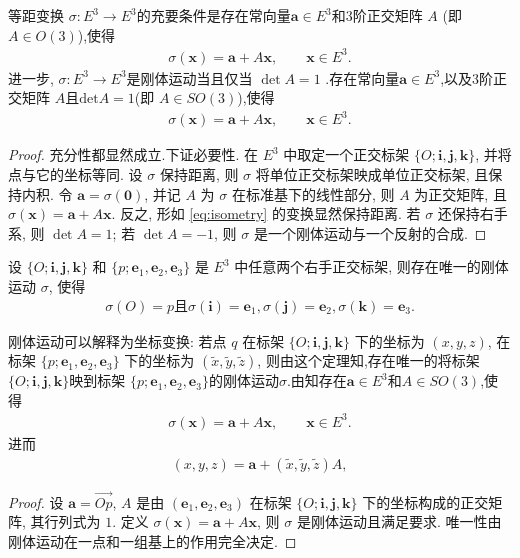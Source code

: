 \documentclass[../../main.tex]{subfiles}%
\begin{document}
\begin{theorem}\label{theorem:刚体运动等距变换的充要条件}
等距变换 $\sigma: E^3 \to E^3$的充要条件是存在常向量$\bm a\in E^3$和$3$阶正交矩阵 $A$ (即$A\in O(3)$),使得
\begin{align}
\sigma(\bm x) = \bm a + A\bm x, \qquad \bm x\in E^3. \label{eq:isometry}
\end{align}
进一步, $\sigma: E^3 \to E^3$是刚体运动当且仅当 $\det A = 1$ .存在常向量$\bm a\in E^3$,以及$3$阶正交矩阵 $A$且$\mathrm{det}A=1$(即 $A\in SO(3)$),使得
\begin{align*}
\sigma(\bm x) = \bm a + A\bm x, \qquad \bm x\in E^3.
\end{align*}
\end{theorem}
\begin{proof}

充分性都显然成立.下证必要性.
在 $E^3$ 中取定一个正交标架 $\{O;\bm i,\bm j,\bm k\}$, 并将点与它的坐标等同. 设 $\sigma$ 保持距离, 则 $\sigma$ 将单位正交标架映成单位正交标架, 且保持内积. 令 $\bm a = \sigma(\bm 0)$, 并记 $A$ 为 $\sigma$ 在标准基下的线性部分, 则 $A$ 为正交矩阵, 且 $\sigma(\bm x)=\bm a+A\bm x$. 反之, 形如 \eqref{eq:isometry} 的变换显然保持距离. 若 $\sigma$ 还保持右手系, 则 $\det A = 1$; 若 $\det A = -1$, 则 $\sigma$ 是一个刚体运动与一个反射的合成.
\end{proof}

\begin{theorem}
设 $\{O;\bm i,\bm j,\bm k\}$ 和 $\{p;\bm e_1,\bm e_2,\bm e_3\}$ 是 $E^3$ 中任意两个右手正交标架, 则存在唯一的刚体运动 $\sigma$, 使得
\begin{align*}
\sigma (O)=p\text{且}\sigma (\boldsymbol{i})=\boldsymbol{e}_1,\sigma (\boldsymbol{j})=\boldsymbol{e}_2,\sigma (\boldsymbol{k})=\boldsymbol{e}_3.
\end{align*}
\end{theorem}
\begin{remark}
刚体运动可以解释为坐标变换: 若点 $q$ 在标架 $\{O;\bm i,\bm j,\bm k\}$ 下的坐标为 $(x,y,z)$, 在标架 $\{p;\bm e_1,\bm e_2,\bm e_3\}$ 下的坐标为 $(\tilde x,\tilde y,\tilde z)$, 则由这个定理知,存在唯一的将标架 $\{O;\bm i,\bm j,\bm k\}$映到标架 $\{p;\bm e_1,\bm e_2,\bm e_3\}$的刚体运动$\sigma$.由知存在$\bm a\in E^3$和$A\in SO(3)$,使得
\begin{align*}
\sigma(\bm x) = \bm a + A\bm x, \qquad \bm x\in E^3.
\end{align*}
进而
\begin{align*}
(x,y,z) = \bm a + (\tilde x,\tilde y,\tilde z)A,
\end{align*}
\end{remark}
\begin{proof}

设 $\bm a = \overrightarrow{Op}$, $A$ 是由 $(\bm e_1,\bm e_2,\bm e_3)$ 在标架 $\{O;\bm i,\bm j,\bm k\}$ 下的坐标构成的正交矩阵, 其行列式为 $1$. 定义 $\sigma(\bm x)=\bm a + A\bm x$, 则 $\sigma$ 是刚体运动且满足要求. 唯一性由刚体运动在一点和一组基上的作用完全决定.
\end{proof}
\end{document}

